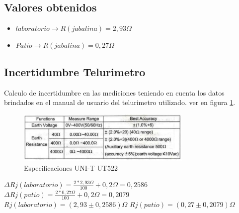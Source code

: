 \documentclass[12pt, letterpaper]{article}
\begin{document}
\subsection{Valores obtenidos}
\begin{itemize}
    \item $laboratorio \rightarrow R(jabalina)=2,93 \Omega$
    \item $Patio \rightarrow R(jabalina)=0,27 \Omega$
\end{itemize}

\subsection{Incertidumbre Telurimetro}
Calculo de incertidumbre en las mediciones teniendo en cuenta los datos brindados en el manual de usuario del telurimetro utilizado. ver en figura \ref{fig:epecificacion_telur}.
\begin{figure}[H]
	\centering
	\includegraphics[width=0.75\textwidth]{imagenes/especificaciones_telurimetro.png}
	\caption{Especificaciones UNI-T UT522}
	\label{fig:epecificacion_telur}
\end{figure}
$\Delta Rj(laboratorio)=\frac{2*2,93\Omega}{100}+0,2\Omega=0,2586$
\singlespacing
$\Delta Rj(patio)=\frac{2*0,27\Omega}{100}+0,2\Omega=0,2079$
\singlespacing
$Rj(laboratorio) = (2,93\pm0,2586)\Omega$
\singlespacing
$Rj(patio) = (0,27\pm0,2079)\Omega$
\end{document}
